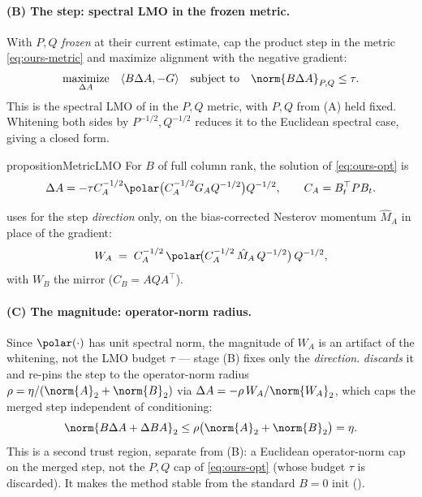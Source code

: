 \paragraph{(B) The step: spectral LMO in the frozen metric.} With $P,Q$ \emph{frozen} at their current estimate, cap the product step in the metric \eqref{eq:ours-metric} and maximize alignment with the negative gradient:
\begin{equation}
\begin{array}{llll}
\underset{\Delta A}{\mbox{maximize}}&
\langle B\Delta A,-G\rangle
& \mbox{subject to} & \norm{B\Delta A}_{P,Q}\leq\tau. 
\end{array}
  \label{eq:ours-opt}
\end{equation}
This is the spectral LMO of  in the $P,Q$ metric, with $P,Q$ from (A) held fixed. Whitening both sides by $P^{-1/2},Q^{-1/2}$ reduces it to the Euclidean spectral case, giving a closed form.

\begin{restatable}{proposition}{MetricLMO}\label{prop:ours}
For $B$ of full column rank, the solution of \eqref{eq:ours-opt} is
\begin{equation*}
  \Delta A = -\tau C_A^{-1/2} \polar \big(C_A^{-1/2} G_A Q^{-1/2}\big) Q^{-1/2},
  \qquad C_A=B_t^\top P B_t .
\end{equation*}
\end{restatable}
\medskip
\noindent \methodname{} uses  for the step \emph{direction} only, on the bias-corrected Nesterov momentum $\hat M_A$ in place of the gradient:
\begin{equation}
  W_A \;=\; C_A^{-1/2}\,\polar\!\big(C_A^{-1/2}\,\hat M_A\,Q^{-1/2}\big)\,Q^{-1/2},
  \label{eq:ours-lmo}
\end{equation}
with $W_B$ the mirror ($C_B=AQA^\top$).

\paragraph{(C) The magnitude: operator-norm radius.} Since $\polar(\cdot)$ has unit spectral norm, the magnitude of $W_A$ is an artifact of the whitening, not the LMO budget $\tau$ --- stage (B) fixes only the \emph{direction}.  \emph{discards} it and re-pins the step to the operator-norm radius $\rho=\eta/(\norm{A}_2+\norm{B}_2)$ via $\Delta A=-\rho\,W_A/\norm{W_A}_2$, which caps the merged step independent of conditioning:
\begin{equation}
  \norm{B\Delta A+\Delta B A}_2\le\rho\big(\norm{A}_2+\norm{B}_2\big)=\eta .
  \label{eq:ours-prodcap}
\end{equation}
This is a second trust region, separate from (B): a Euclidean operator-norm cap on the merged step, not the $P,Q$ cap of \eqref{eq:ours-opt} (whose budget $\tau$ is discarded). It makes the method stable from the standard $B{=}0$ init ().

